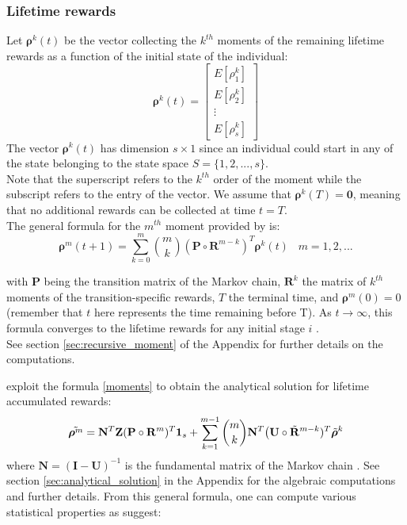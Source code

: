 \documentclass[\main/main.tex]{subfiles}
\begin{document}
\subsubsection{Lifetime rewards}
Let $\bm{\rho}^k(t)$ be the vector collecting the $k^{th}$ moments of the remaining lifetime rewards as a function of the initial state of the individual:
\begin{equation}
\bm{\rho}^{k}(t) =
\begin{bmatrix}
E[\rho^k_1]\\
E[\rho^k_2]\\
\vdots\\
E[\rho^k_{s}]
\end{bmatrix}
\end{equation}
The vector $\bm{\rho}^k(t)$ has dimension $s \times 1$ since an individual could start in any of the state belonging to the state space $S = \{1,2,..., s\}$.\\ Note that the superscript refers to the $k^{th}$ order of the moment while the subscript refers to the entry of the vector.
We assume that $\bm{\rho}^k(T) = \bm{0}$, meaning that no additional rewards can be collected at time $t=T$.\\



The general formula for the  $m^{th}$ moment provided by \cite{Caswell2011} is:
\begin{equation}\label{moments}
    \bm{\rho}^m(t+1) = \sum_{k=0}^{m} {m \choose k} (\mathbf{P} \circ \mathbf{R}^{m-k}) ^ T \bm{\rho}^k(t) \;\; \; m=1,2,...
\end{equation}

with $\mathbf{P}$ being the transition matrix of the Markov
chain, $\mathbf{R}^k$ the matrix of $k^{th}$ moments of the transition-specific rewards, $T$ the terminal time, and $\bm{\rho}^m(0)=0$ (remember that $t$ here represents the time remaining before T).
As $t \rightarrow \infty$, this formula converges to the lifetime rewards for any initial stage $i$ \citep{Caswell2011}.\\
See section \ref{sec:recursive_moment} of the Appendix for further details on the computations.




\cite{VanDaalen2017} exploit the formula \ref{moments} to obtain the analytical solution for lifetime accumulated rewards:
\begin{equation}
     \Tilde{\bm{\rho}^m} = \mathbf{N}^T\mathbf{Z} (\mathbf{P} \circ \mathbf{R}^m)^T \bm{1}_s + \sum_{k=1}^{m-1} \binom{m}{k} \mathbf{N}^T \big( \mathbf{U} \circ \Tilde{\mathbf{R}}^{m-k})^T  \Tilde{\bm{\rho}}^k 
\end{equation}
where $\mathbf{N} = (\mathbf{I} - \mathbf{U})^{-1}$ is the fundamental matrix of the Markov chain \citep{Caswell2018}. See section \ref{sec:analytical_solution} in the Appendix for the algebraic computations and further details.
From this general formula, one can compute various statistical properties as \cite{VanDaalen2015} suggest:\\
\end{document}
